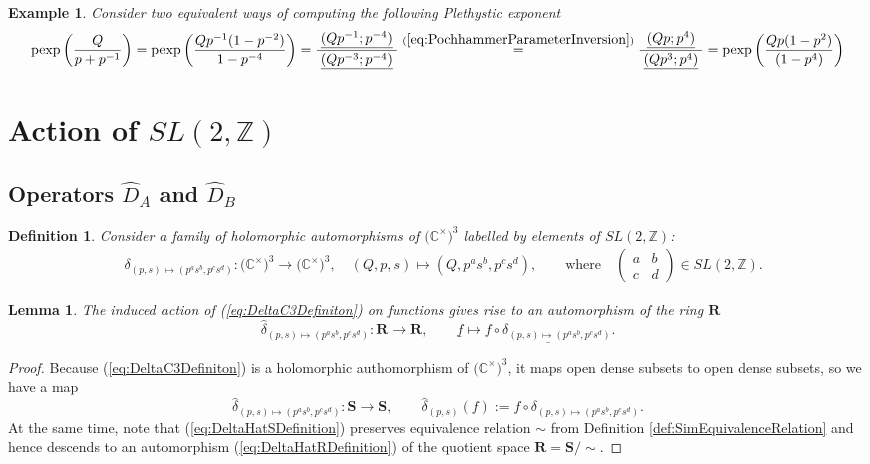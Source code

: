 \documentclass{amsart}
\newtheorem{definition}[theorem]{Definition}
\newtheorem{lemma}[theorem]{Lemma}
\newtheorem{example}[theorem]{Example}
\begin{document}
\begin{example}
Consider two equivalent ways of computing the following Plethystic exponent
\begin{equation*}
\mathrm{pexp}\left(\frac Q{p+p^{-1}}\right)=\mathrm{pexp}\left(\frac{Qp^{-1}(1-p^{-2})}{1-p^{-4}}\right)=\frac{\underline{(Qp^{-1};p^{-4})}}{\;\underline{(Qp^{-3};p^{-4})}\;} \overset{(\ref{eq:PochhammerParameterInversion})}{=} \frac{\underline{(Qp;p^4)}}{\;\underline{(Qp^3;p^4)}\;} =\mathrm{pexp}\left(\frac{Qp(1-p^2)}{(1-p^4)}\right)
\end{equation*}
\label{ex:PlethysticTwoWays}
\end{example}

\section{Action of $SL(2,\mathbb Z)$}
\label{sec:SL2ZActionOnMatR3}
\subsection{Operators $\widehat D_A$ and $\widehat D_B$}


\begin{definition}
Consider a family of holomorphic automorphisms of $\big(\mathbb C^\times\big)^3$ labelled by elements of $SL(2,\mathbb Z)$:
\begin{align}
&\delta_{(p,s)\mapsto (p^as^b,p^cs^d)}:\big(\mathbb C^\times\big)^3\rightarrow\big(\mathbb C^\times\big)^3,\quad (Q,p,s)\mapsto(Q,p^as^b,p^cs^d),\qquad\textrm{where}\quad \left(\begin{array}{cc}a&b\\c&d\end{array}\right)\in SL(2,\mathbb Z).
\label{eq:DeltaC3Definiton}
\end{align}
\end{definition}
\begin{lemma}
The induced action of (\ref{eq:DeltaC3Definiton}) on functions gives rise to an automorphism of the ring $\mathbf R$
\begin{equation}
\widehat{\delta}_{(p,s)\mapsto(p^as^b,p^cs^d)}:\mathbf R\rightarrow\mathbf R,\qquad \underline{f}\mapsto\underline{f\circ\delta_{(p,s)\mapsto(p^as^b,p^cs^d)}}.
\label{eq:DeltaHatRDefinition}
\end{equation}
\end{lemma}
\begin{proof}
Because (\ref{eq:DeltaC3Definiton}) is a holomorphic authomorphism of $\big(\mathbb C^\times\big)^3$, it maps open dense subsets to open dense subsets, so we have a map
\begin{equation}
\widehat\delta_{(p,s)\mapsto(p^as^b,p^cs^d)}:\mathbf S\rightarrow\mathbf S,\qquad \widehat\delta_{(p,s)}(f):=f\circ \delta_{(p,s)\mapsto(p^as^b,p^cs^d)}.
\label{eq:DeltaHatSDefinition}
\end{equation}
At the same time, note that (\ref{eq:DeltaHatSDefinition}) preserves equivalence relation $\sim$ from Definition \ref{def:SimEquivalenceRelation} and hence descends to an automorphism (\ref{eq:DeltaHatRDefinition}) of the quotient space $\mathbf R=\mathbf S\big/\sim$.
\end{proof}
\end{document}
